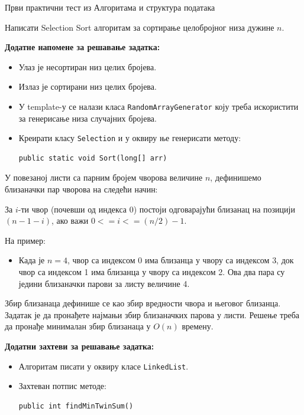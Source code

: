 
Први практични тест из Алгоритама и структура података

Написати Selection Sort алгоритам за сортирање целобројног низа дужине $n$.

\textbf{Додатне напомене за решавање задатка:}
\begin{itemize}
	\item Улаз је несортиран низ целих бројева.
	\item Излаз је сортирани низ целих бројева.
	\item У template-у се налази класа \texttt{RandomArrayGenerator} коју треба искористити за генерисање низа случајних бројева.
	\item Креирати класу \texttt{Selection} и у оквиру ње генерисати методу:
	\begin{Verbatim}[fontsize=\small]
public static void Sort(long[] arr)
	\end{Verbatim}
\end{itemize}

У повезаној листи са парним бројем чворова величине $n$, дефинишемо близаначки пар чворова на следећи начин:

За $i$-ти чвор (почевши од индекса 0) постоји одговарајући близанац на позицији $(n-1-i)$, ако важи $0 <= i <= (n/2)-1$.

На пример:
\begin{itemize}
	\item Када је $n=4$, чвор са индексом 0 има близанца у чвору са индексом 3, док чвор са индексом 1 има близанца у чвору са индексом 2. Ова два пара су једини близаначки парови за листу величине 4.
\end{itemize}

Збир близанаца дефинише се као збир вредности чвора и његовог близанца. Задатак је да пронађете најмањи збир близаначких парова у листи. Решење треба да пронађе минималан збир близанаца у $O(n)$ времену.

\textbf{Додатни захтеви за решавање задатка:}
\begin{itemize}
	\item Алгоритам писати у оквиру класе \texttt{LinkedList}.
	\item Захтеван потпис методе:
	\begin{Verbatim}[fontsize=\small]
public int findMinTwinSum()
	\end{Verbatim}
\end{itemize}

